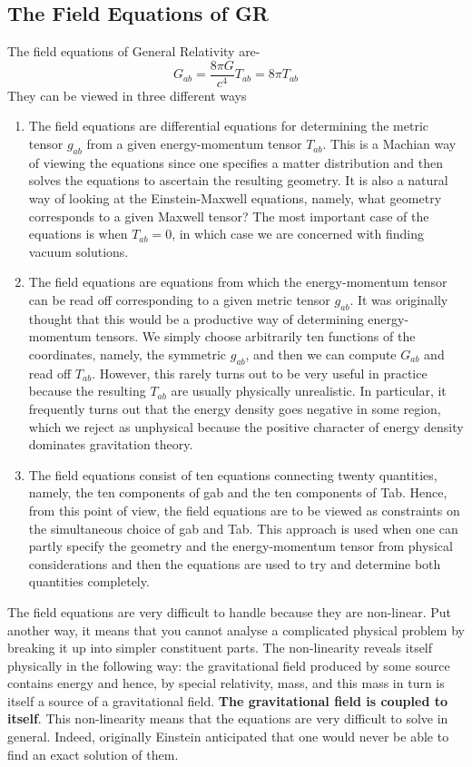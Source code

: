 \documentclass[12pt,a4paper]{article}
\numberwithin{table}{section}
\numberwithin{figure}{section}
\numberwithin{equation}{section}
\theoremstyle{remark}
\theoremstyle{definition}
\begin{document}
\subsection{The Field Equations of GR}
The field equations of General Relativity are-
\begin{equation}
    G_{ab}=\dfrac{8\pi G}{c^4} T_{ab}=8\pi T_{ab}
\end{equation}
They can be viewed in three different ways
\begin{enumerate}
    \item The field equations are differential equations for determining the metric tensor $g_{ab}$ from a given energy-momentum tensor $T_{ab}$. This is a Machian way of viewing the equations since one specifies a matter distribution and then solves the equations to ascertain the resulting geometry. It is also a natural way of looking at the Einstein-Maxwell equations, namely, what geometry  corresponds to a given Maxwell tensor? The most important case of the equations is when $T_{ab}=0$, in which case we are concerned with finding vacuum solutions.
    \item The field equations are equations from which the energy-momentum tensor can be read off corresponding to a given metric tensor $g_{ab}$. It was originally thought that this would be a productive way of determining energy-momentum tensors. We simply choose arbitrarily ten functions of the coordinates, namely, the symmetric $g_{ab}$, and then we can compute $G_{ab}$ and read off $T_{ab}$. However, this rarely turns out to be very useful in practice because the resulting $T_{ab}$ are usually physically unrealistic. In particular, it frequently turns out that the energy density goes negative in some region, which we reject as unphysical because the positive character of energy density dominates gravitation theory.
    \item The field equations consist of ten equations connecting twenty  quantities, namely, the ten components of gab and the ten components of Tab. Hence, from this point of view, the field equations are to be viewed as constraints on the simultaneous choice of gab and Tab. This approach is used when one can partly specify the geometry and the energy-momentum tensor from physical considerations and then the equations are used to try and determine both quantities completely.
\end{enumerate}
The field equations are very difficult to handle because they are non-linear. 
Put another way, it means that you cannot analyse a complicated physical problem by breaking it up into simpler constituent parts. The non-linearity reveals itself physically in the following way: the gravitational field produced by some source contains energy and hence, by special relativity, mass, and this mass in turn is itself a source of a gravitational field. \textbf{The gravitational field is coupled to itself}. This non-linearity means that the equations are very difficult to solve in general. Indeed, originally Einstein anticipated that one would never be able to find 
an exact solution of them. 
\end{document}
